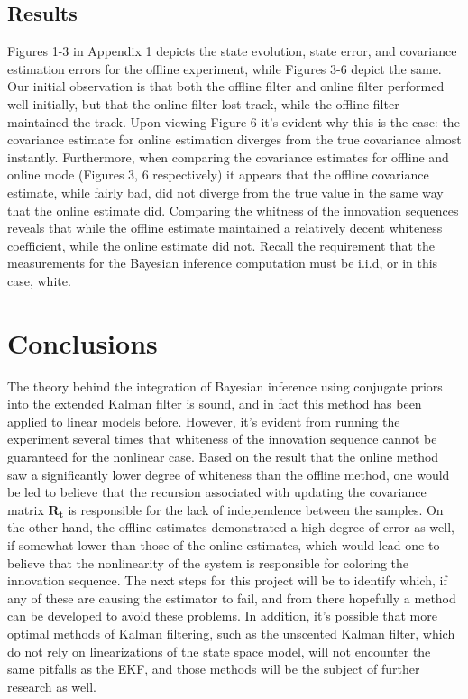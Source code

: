 \documentclass[11pt]{article}
\begin{document}
\subsection{Results}

Figures 1-3 in Appendix 1 depicts the state evolution, state error, and covariance estimation errors for the offline experiment, while Figures 3-6 depict the same. Our initial observation is that both the offline filter and online filter performed well initially, but that the online filter lost track, while the offline filter maintained the track. Upon viewing Figure 6 it's evident why this is the case: the covariance estimate for online estimation diverges from the true covariance almost instantly. Furthermore, when comparing the covariance estimates for offline and online mode (Figures 3, 6 respectively) it appears that the offline covariance estimate, while fairly bad, did not diverge from the true value in the same way that the online estimate did. Comparing the whitness of the innovation sequences reveals that while the offline estimate maintained a relatively decent whiteness coefficient, while the online estimate did not. Recall the requirement that the measurements for the Bayesian inference computation must be i.i.d, or in this case, white.

\section*{Conclusions}

The theory behind the integration of Bayesian inference using conjugate priors into the extended Kalman filter is sound, and in fact this method has been applied to linear models before. However, it's evident from running the experiment several times that whiteness of the innovation sequence cannot be guaranteed for the nonlinear case. Based on the result that the online method saw a significantly lower degree of whiteness than the offline method, one would be led to believe that the recursion associated with updating the covariance matrix $\mathbf{R_{t}}$ is responsible for the lack of independence between the samples. On the other hand, the offline estimates demonstrated a high degree of error as well, if somewhat lower than those of the online estimates, which would lead one to believe that the nonlinearity of the system is responsible for coloring the innovation sequence. The next steps for this project will be to identify which, if any of these are causing the estimator to fail, and from there hopefully a method can be developed to avoid these problems. In addition, it's possible that more optimal methods of Kalman filtering, such as the unscented Kalman filter, which do not rely on linearizations of the state space model, will not encounter the same pitfalls as the EKF, and those methods will be the subject of further research as well.
\end{document}
